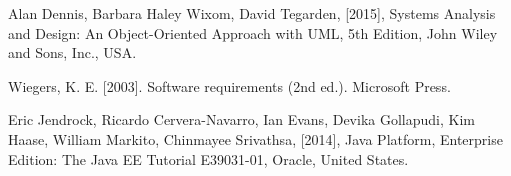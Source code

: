 \begin{thebibliography}{5}


\bibitem{}
Alan Dennis, Barbara Haley Wixom, David Tegarden, [2015], Systems Analysis and Design: An Object-Oriented Approach with UML, 5th Edition, John Wiley and Sons, Inc., USA. 

\bibitem{}
Wiegers, K. E. [2003]. Software requirements (2nd ed.). Microsoft Press.

\bibitem{}
Eric Jendrock, Ricardo Cervera-Navarro, Ian Evans, Devika Gollapudi, Kim Haase, William Markito, Chinmayee Srivathsa, [2014], Java Platform, Enterprise Edition: The Java EE Tutorial E39031-01, Oracle, United States. 

\end{thebibliography}